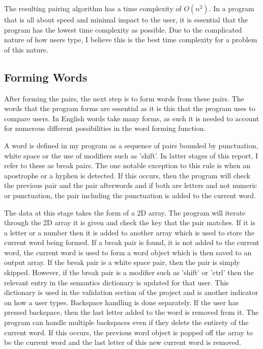 \documentclass[10pt,a4paper]{report}
\begin{document}
The resulting pairing algorithm has a time complexity of \(O(n^2)\). In a program that is all about speed and minimal impact to the user, it is essential that the program has the lowest time complexity as possible. Due to the complicated nature of how users type, I believe this is the best time complexity for a problem of this nature.

\subsection{Forming Words}

After forming the pairs, the next step is to form words from these pairs. The words that the program forms are essential as it is this that the program uses to compare users. In English words take many forms, as such it is needed to account for numerous different possibilities in the word forming function.

A word is defined in my program as a sequence of pairs bounded by punctuation, white space or the use of modifiers such as 'shift'. In latter stages of this report, I refer to these as break pairs. The one notable exception to this rule is when an apostrophe or a hyphen is detected. If this occurs, then the program will check the previous pair and the pair afterwords and if both are letters and not numeric or punctuation, the pair including the punctuation is added to the current word. 

The data at this stage takes the form of a 2D array. The program will iterate through the 2D array it is given and check the key that the pair matches. If it is a letter or a number then it is added to another array which is used to store the current word being formed. If a break pair is found, it is not added to the current word, the current word is used to form a word object which is then saved to an output array. If the break pair is a white space pair, then the pair is simply skipped. However, if the break pair is a modifier such as 'shift' or 'ctrl' then the relevant entry in the semantics dictionary is updated for that user. This dictionary is used in the validation section of the project and is another indicator on how a user types. Backspace handling is done separately. If the user has pressed backspace, then the last letter added to the word is removed from it. The program can handle multiple backspaces even if they delete the entirety of the current word. If this occurs, the previous word object is popped off the array to be the current word and the last letter of this new current word is removed.
\end{document}
